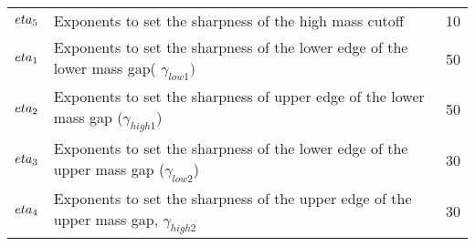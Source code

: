 \begin{table}[ht]
\begin{tabular}{lll}
$\\eta_5$ & Exponents to set the sharpness of the high mass cutoff & 10 \\
$\\eta_1$ & Exponents to set the sharpness of the lower edge of the lower mass gap( $\gamma_{low1})$ & 50 \\
$\\eta_2$ & Exponents to set the sharpness of upper edge of the lower mass gap ($\gamma_{high1}$) & 50 \\
$\\eta_3$ & Exponents to set the sharpness of the lower edge of the upper mass gap ($\gamma_{low2}$) & 30 \\
$\\eta_4$ &  Exponents to set the sharpness of the upper edge of the upper mass gap, $\gamma_{high2}$ & 30 \\
\hline
\end{tabular}
\end{table}
